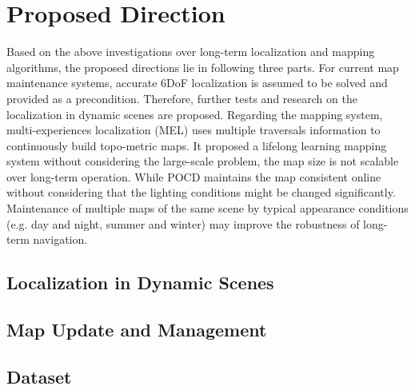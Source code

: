 \chapter{Proposed Direction}
Based on the above investigations over long-term localization\cite{sarlin2019coarse,paton2016bridging} and mapping\cite{qian2022pocd,schmid2022panoptic} algorithms, the proposed directions lie in following three parts. For current map maintenance systems, accurate 6DoF localization is assumed to be solved and provided as a precondition. Therefore, further tests and research on the localization in dynamic scenes are proposed. Regarding the mapping system, multi-experiences localization (MEL)\cite{paton2016bridging} uses multiple traversals information to continuously build topo-metric maps. It proposed a lifelong learning mapping system without considering the large-scale problem, the map size is not scalable over long-term operation. While POCD\cite{qian2022pocd} maintains the map consistent online without considering that the lighting conditions might be changed significantly. Maintenance of multiple maps of the same scene by typical appearance conditions (e.g. day and night, summer and winter) may improve the robustness of long-term navigation.

\section{Localization in Dynamic Scenes}


\section{Map Update and Management}


\section{Dataset}


